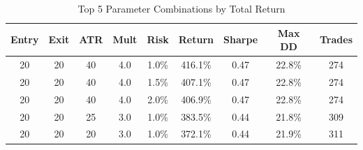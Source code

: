 \documentclass[11pt,a4paper]{article}
\begin{document}
\begin{table}[H]
\centering
\small
\begin{tabular}{ccccccccc}
\toprule
\textbf{Entry} & \textbf{Exit} & \textbf{ATR} & \textbf{Mult} & \textbf{Risk} & \textbf{Return} & \textbf{Sharpe} & \textbf{Max DD} & \textbf{Trades} \\
\midrule
20 & 20 & 40 & 4.0 & 1.0\% & 416.1\% & 0.47 & 22.8\% & 274 \\
20 & 20 & 40 & 4.0 & 1.5\% & 407.1\% & 0.47 & 22.8\% & 274 \\
20 & 20 & 40 & 4.0 & 2.0\% & 406.9\% & 0.47 & 22.8\% & 274 \\
20 & 20 & 25 & 3.0 & 1.0\% & 383.5\% & 0.44 & 21.8\% & 309 \\
20 & 20 & 20 & 3.0 & 1.0\% & 372.1\% & 0.44 & 21.9\% & 311 \\
\bottomrule
\end{tabular}
\caption{Top 5 Parameter Combinations by Total Return}
\end{table}
\end{document}

